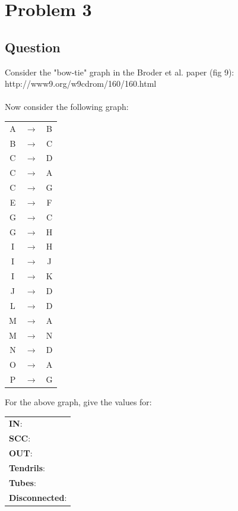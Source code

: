 \section{Problem 3}
\label{Problem3}

\subsection{Question}
\vspace*{10pt}
Consider the "bow-tie" graph in the Broder et al. paper (fig 9):\\ http://www9.org/w9cdrom/160/160.html\\
\\
Now consider the following graph:
\\
\begin{tabular}{c c c}
A & $\to$ & B\\
B & $\to$ & C\\
C & $\to$ & D\\
C & $\to$ & A\\
C & $\to$ & G\\
E & $\to$ & F\\
G & $\to$ & C\\
G & $\to$ & H\\
I & $\to$ & H\\
I & $\to$ & J\\
I & $\to$ & K\\
J & $\to$ & D\\
L & $\to$ & D\\
M & $\to$ & A\\
M & $\to$ & N\\
N & $\to$ & D\\
O & $\to$ & A\\
P & $\to$ & G\\
\end{tabular}
\vspace*{5mm}

	For the above graph, give the values for:\\
	
	\begin{tabular}{l}
	\textbf{IN}:\\
	\textbf{SCC}:\\
	\textbf{OUT}:\\
	\textbf{Tendrils}:\\
	\textbf{Tubes}:\\
	\textbf{Disconnected}:\\
	
	\end{tabular}
	
